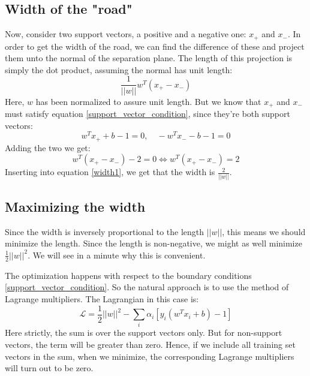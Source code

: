 \documentclass[12pt, a4paper]{article}
\numberwithin{equation}{section}
\begin{document}
\subsection{Width of the "road"}
Now, consider two support vectors, a positive and a negative one: $x_+$ and $x_-$. In order to get the width of the road, we can find the difference of these and project them unto the normal of the separation plane. The length of this projection is simply the dot product, assuming the normal has unit length:
\begin{equation}
\label{width1}
\frac{1}{||w||} w^T(x_+ - x_-)
\end{equation}
Here, $w$ has been normalized to assure unit length. But we know that $x_+$ and $x_-$ must satisfy equation \ref{support_vector_condition}, since they're both support vectors:
\begin{equation}
w^T x_+ + b - 1 = 0,\quad -w^T x_- - b - 1 = 0
\end{equation}
Adding the two we get:
\begin{equation}
w^T(x_+ - x_-) - 2 = 0\Leftrightarrow w^T(x_+ - x_-) = 2
\end{equation}
Inserting into equation \ref{width1}, we get that the width is $\frac{2}{||w||}$.

\subsection{Maximizing the width}
Since the width is inversely proportional to the length $||w||$, this means we should minimize the length. Since the length is non-negative, we might as well minimize $\frac{1}{2}||w||^2$. We will see in a minute why this is convenient.

The optimization happens with respect to the boundary conditions \ref{support_vector_condition}. So the natural approach is to use the method of Lagrange multipliers. The Lagrangian in this case is:
\begin{equation}
\mathcal{L}=\frac{1}{2}||w||^2-\sum_i\alpha_i\left[y_i(w^T x_i + b)-1\right]
\end{equation}
Here strictly, the sum is over the support vectors only. But for non-support vectors, the term will be greater than zero. Hence, if we include all training set vectors in the sum, when we minimize, the corresponding Lagrange multipliers will turn out to be zero.
\end{document}

